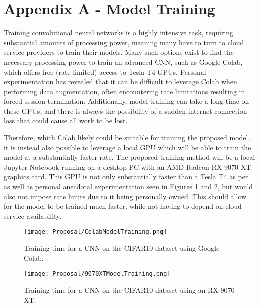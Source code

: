 \begingroup
\renewcommand\thechapter{A}
\titleformat{\chapter}[display]
{\normalfont\huge\bfseries}{}{20pt}{\Huge}
\setcounter{section}{0} 
\setcounter{figure}{0}

\chapter*{Appendix A - Model Training}

Training convolutional neural networks is a highly intensive task, requiring substantial amounts of processing power,
meaning many have to turn to cloud service providers to train their models.
Many such options exist to find the necessary processing power to train an advanced CNN, such as Google Colab, which offers 
free (rate-limited) access to Tesla T4 GPUs. Personal experimentation has revealed that it can be difficult to leverage Colab 
when performing data augmentation, often encountering rate limitations resulting in forced session termination. Additionally,
model training can take a long time on these GPUs, and there is always the possibility of a sudden internet connection loss that could 
cause all work to be lost.

\para Therefore, which Colab likely could be suitable for training the proposed model, it is instead also 
possible to leverage a local GPU which will be able to train the model at a substantially faster rate.
The proposed training method will be a local Jupyter Notebook running on a desktop PC with an AMD Radeon RX 9070 XT graphics card.
This GPU is not only substantially faster than a Tesla T4 as per \textcite{hardwaredbTeslaT4Vs,technicalcityRX9070XT} as well as personal 
anecdotal experimentation seen in Figures \ref{fig:GPUComparisonA} and \ref{fig:GPUComparisonB},
but would also not impose rate limits due to it being personally owned. This should allow for the model to be trained much faster, while not 
having to depend on cloud service availability.

\begin{figure}[H]
    \centering
    \texttt{[image: Proposal/ColabModelTraining.png]}
    \caption{Training time for a CNN on the CIFAR10 dataset using Google Colab.\label{fig:GPUComparisonA}}
\end{figure}

\begin{figure}[H]
    \centering
    \texttt{[image: Proposal/9070XTModelTraining.png]}
    \caption{Training time for a CNN on the CIFAR10 dataset using an RX 9070 XT.\label{fig:GPUComparisonB}}
\end{figure}

\endgroup 